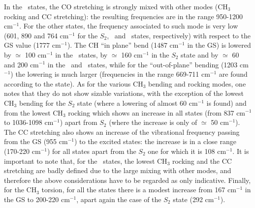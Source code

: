 In the \npi\ states, the CO stretching is strongly mixed with other modes
(CH$_3$ rocking and CC stretching): the resulting frequencies are in the
range 950-1200 cm$^{-1}$.  For the other states, the frequency associated
to such mode is very low (601, 890 and 764 cm$^{-1}$ for the $S_2$, \tpipi\
and \tspi\ states, respectively) with respect to the GS value (1777
cm$^{-1}$).  The CH ``in plane'' bend (1487 cm$^{-1}$ in the GS) is lowered
by $\simeq$ 100 cm$^{-1}$ in the \npi\ states, by $\simeq$ 160 cm$^{-1}$ in
the $S_2$ state and by $\simeq$ 60 and 200 cm$^{-1}$ in the \tpipi\ and
\tnpi\ states, while for the ``out-of-plane'' bending (1203 cm$^{-1}$) the
lowering is much larger (frequencies in the range 669-711 cm$^{-1}$ are
found according to the state). As for the various CH$_3$ bending and rocking
modes, one notes that they do not show sizable variations, with the
exception of the lowest CH$_3$ bending for the $S_2$ state (where a lowering
of almost 60 cm$^{-1}$ is found) and from the lowest CH$_3$ rocking which
shows an increase in all states (from 837 cm$^{-1}$ to 1036-1098 cm$^{-1}$)
apart from $S_2$ (where the increase is only of $\simeq$ 50 cm$^{-1}$).  The
CC stretching also shows an increase of the vibrational frequency passing
from the GS (955 cm$^{-1}$) to the excited states: the increase is in a
close range (170-220 cm$^{-1}$) for all states apart from the $S_2$ one for
which it is 108 cm$^{-1}$. It is important to note that, for the \npi\
states, the lowest CH$_3$ rocking and the CC stretching are badly defined
due to the large mixing with other modes, and therefore the above
considerations have to be regarded as only indicative.  Finally, for the
CH$_3$ torsion, for all the states there is a modest increase from 167
cm$^{-1}$ in the GS to 200-220 cm$^{-1}$, apart again the case of the $S_2$
state (292 cm$^{-1}$).

